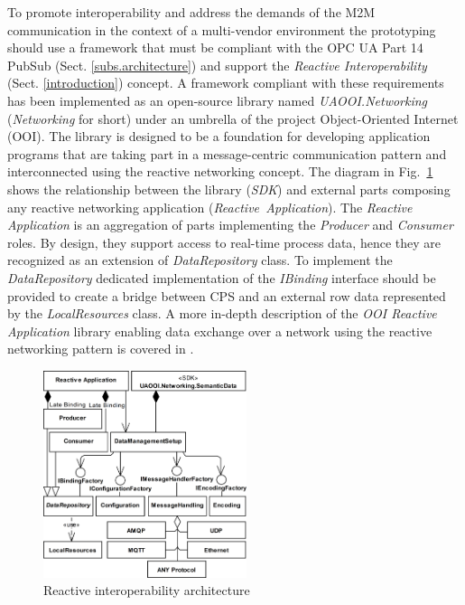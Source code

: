 \documentclass[runningheads]{llncs}
\begin{document}
To promote interoperability and address the demands of the M2M communication in the context of a multi-vendor environment the prototyping should use a framework that must be compliant with the OPC UA Part 14 PubSub (Sect. \ref{subs.architecture}) and support the \emph{Reactive Interoperability} (Sect. \ref{introduction}) concept. A framework compliant with these requirements has been implemented as an open-source library named \emph{UAOOI.Networking} (\emph{Networking} for short) under an umbrella of the project Object-Oriented Internet  (OOI)\cite{mariusz_postol_2020_4361640}. The library is designed to be a foundation for developing application programs that are taking part in a message-centric communication pattern and interconnected using the reactive networking concept. The diagram in Fig.~\ref{figure2.UADataApplicationArchitecture} shows the relationship between the library (\emph{SDK}) and external parts composing any reactive networking application (\emph{Reactive\ Application}). The \emph{Reactive Application} is an aggregation of parts implementing the \emph{Producer} and \emph{Consumer} roles. By design, they support access to real-time process data, hence they are recognized as an extension of \emph{DataRepository} class. To implement the \emph{DataRepository} dedicated implementation of the \emph{IBinding} interface should be provided to create a bridge between CPS and an external row data represented by the \emph{LocalResources} class. A more in-depth description of the \emph{OOI Reactive Application} library enabling data exchange over a network using the reactive networking pattern is covered in \cite{mpostol2020}.

\begin{figure}
      \centering
      \includegraphics[width=0.53\textwidth]{../../.Media/UADataApplicationArchitecture.png}
      \caption{Reactive interoperability architecture}\label{figure2.UADataApplicationArchitecture}
\end{figure}
\end{document}
